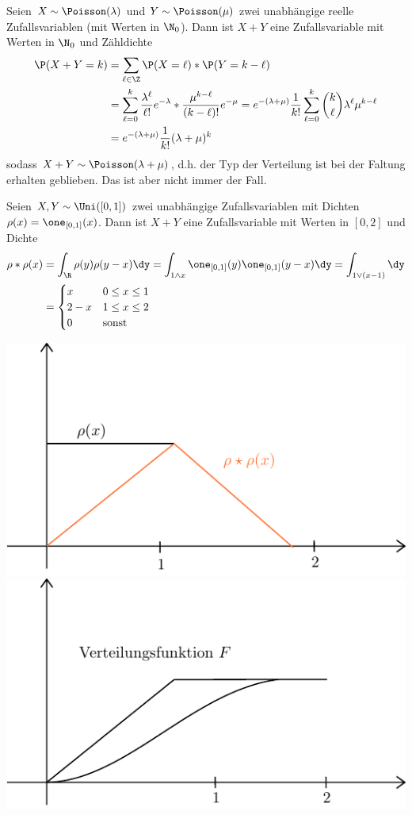 \begin{beispiel}
	Seien $X \sim \Poisson(\lambda)$ und $Y \sim \Poisson(\mu)$ zwei unabhängige reelle Zufallsvariablen (mit Werten in $\N_0$). Dann ist $X+Y$ eine Zufallsvariable mit Werten in $\N_0$ und Zähldichte
	\begin{equation*}
		\begin{aligned}
		\P(X+Y = k) &= \sum_{\ell \in \Z} \P(X=\ell) * \P(Y=k - \ell) \\
		&= \sum_{\ell = 0}^k \frac{\lambda^\ell}{\ell !} e^{-\lambda} * \frac{\mu^{k-\ell}}{(k-\ell)!} e^{-\mu}
		= e^{-(\lambda+\mu)} \frac{1}{k!} \sum_{\ell = 0}^k \binom{k}{\ell} \lambda^\ell \mu^{k-\ell} \\
		&= e^{-(\lambda + \mu)} \frac{1}{k!} (\lambda + \mu)^k
		\end{aligned}
	\end{equation*}
	sodass $X+Y \sim \Poisson(\lambda + \mu)$, d.h. der Typ der Verteilung ist bei der Faltung erhalten geblieben. Das ist aber nicht immer der Fall.
\end{beispiel}

\begin{beispiel}
	Seien $X,Y \sim \Uni([0,1])$ zwei unabhängige Zufallsvariablen mit Dichten $\rho(x) = \one_{[0,1]}(x)$. Dann ist $X+Y$ eine Zufallsvariable mit Werten in $[0,2]$ und Dichte 
	\begin{equation*}
		\begin{aligned}
		\rho \ast \rho (x) 
		&= \int_{\R} \rho(y) \rho(y-x) \dy 
		= \int_{1 \land x} \one_{[0,1]}(y) \one_{[0,1]}(y-x) \dy 
		= \int_{1 \lor (x-1)} \dy \\
		&= \begin{cases}
			x & 0 \le x \le 1 \\
			2-x & 1 \le x \le 2 \\
			0 & \text{sonst}
		\end{cases}
		\end{aligned}
	\end{equation*}
	
	\begin{center}
		\includegraphics[width=.45\textwidth]{./stoch_abbildungen/faltung_dichte.pdf}
		\includegraphics[width=.45\textwidth]{./stoch_abbildungen/faltung_verteilungsfunktion.pdf}
	\end{center}
	
\end{beispiel}